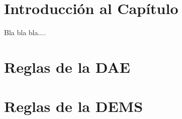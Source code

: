 

\section{Introducción al Capítulo}

Bla bla bla....


\section{Reglas de la DAE}
	
	
	
\section{Reglas de la DEMS}


